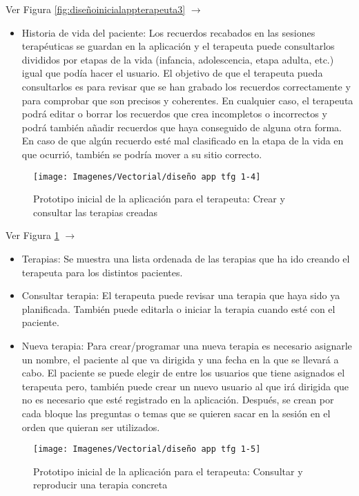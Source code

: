 Ver Figura \ref{fig:diseñoinicialappterapeuta3} $\rightarrow$
\begin{itemize}
	\item Historia de vida del paciente: Los recuerdos recabados en las sesiones terapéuticas se guardan en la aplicación y el terapeuta puede consultarlos divididos por etapas de la vida (infancia, adolescencia, etapa adulta, etc.) igual que podía hacer el usuario. El objetivo de que el terapeuta pueda consultarlos es para revisar que se han grabado los recuerdos correctamente y para comprobar que son precisos y coherentes. En cualquier caso, el terapeuta podrá editar o borrar los recuerdos que crea incompletos o incorrectos y podrá también añadir recuerdos que haya conseguido de alguna otra forma. En caso de que algún recuerdo esté mal clasificado en la etapa de la vida en que ocurrió, también se podría mover a su sitio correcto.
\end{itemize}

\begin{figure}[h]
	\centering
	\texttt{[image: Imagenes/Vectorial/diseño app tfg 1-4]}
	\caption{Prototipo inicial de la aplicación para el terapeuta: Crear y consultar las terapias creadas}
	\label{fig:diseñoinicialappterapeuta4}
\end{figure}

Ver Figura \ref{fig:diseñoinicialappterapeuta4} $\rightarrow$
\begin{itemize}
	\item Terapias: Se muestra una lista ordenada de las terapias que ha ido creando el terapeuta para los distintos pacientes.
	\item Consultar terapia: El terapeuta puede revisar una terapia que haya sido ya planificada. También puede editarla o iniciar la terapia cuando esté con el paciente. 
	\item Nueva terapia: Para crear/programar una nueva terapia es necesario asignarle un nombre, el paciente al que va dirigida y una fecha en la que se llevará a cabo. El paciente se puede elegir de entre los usuarios que tiene asignados el terapeuta pero, también puede crear un nuevo usuario al que irá dirigida que no es necesario que esté registrado en la aplicación. Después, se crean por cada bloque las preguntas o temas que se quieren sacar en la sesión en el orden que quieran ser utilizados.
\end{itemize}

\begin{figure}[h]
	\centering
	\texttt{[image: Imagenes/Vectorial/diseño app tfg 1-5]}
	\caption{Prototipo inicial de la aplicación para el terapeuta: Consultar y reproducir una terapia concreta}
	\label{fig:diseñoinicialappterapeuta5}
\end{figure}

